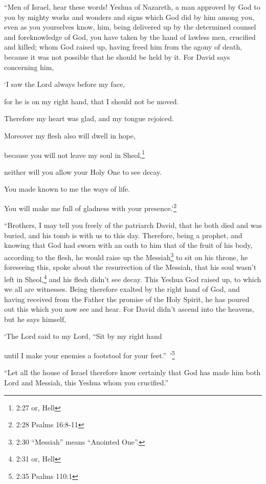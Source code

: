 \myverse{}“Men of Israel, hear these words! Yeshua of Nazareth, a man approved
by God to you by mighty works and wonders and signs which God did by him among you, even as you yourselves
know,
\myverse{}him, being delivered up by the determined counsel and foreknowledge of God,
you have taken by the hand of lawless men, crucified and killed;
\myverse{}whom God raised up, having freed him from the agony of death, because it was
not possible that he should be held by it.
\myverse{}For David says concerning him,

‘I saw the Lord always before my face,

for he is on my right hand, that I should not be moved.

\myverse{}Therefore my heart was glad, and my tongue rejoiced.

Moreover my flesh also will dwell in hope,

\myverse{}because you will not leave my soul in Sheol,\footnote{2:27 or, Hell}

neither will you allow your Holy One to see decay.

\myverse{}You made known to me the ways of life.

You will make me full of gladness with your presence.’\footnote{2:28 Psalms 16:8-11
}

\myverse{}“Brothers, I may tell you freely of the patriarch David, that
he both died and was buried, and his tomb is with us to this day.
\myverse{}Therefore, being a prophet, and knowing that God had sworn with an oath to
him that of the fruit of his body, according to the flesh, he would raise up the Messiah\footnote{2:30 “Messiah” means “Anointed One”.} to sit on his throne,
\myverse{}he foreseeing this, spoke about the resurrection of the Messiah, that his
soul wasn’t left in Sheol,\footnote{2:31 or, Hell} and his flesh didn’t see decay.
\myverse{}This Yeshua God raised up, to which we all are witnesses.
\myverse{}Being therefore exalted by the right hand of God, and having received from
the Father the promise of the Holy Spirit, he has poured out this which you now see and hear.
\myverse{}For David didn’t ascend into the heavens, but he says himself,

‘The Lord said to my Lord, “Sit by my right hand

\myverse{}until I make your enemies a footstool for your feet.” ’\footnote{2:35 Psalms 110:1
}

\myverse{}“Let all the house of Israel therefore know certainly that God
has made him both Lord and Messiah, this Yeshua whom you crucified.”

